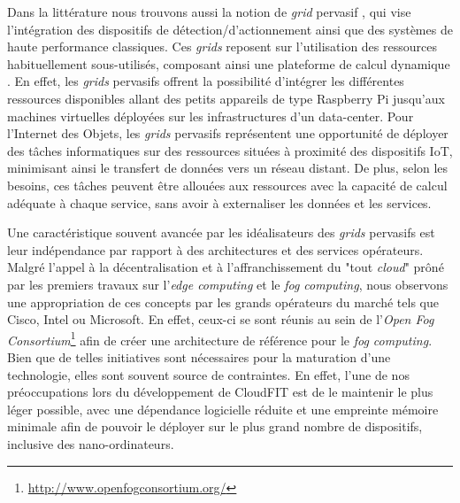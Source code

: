 Dans la littérature nous trouvons aussi la notion de \textit{grid} pervasif \cite{Parashar2010}, qui vise l'intégration des dispositifs de détection/d'actionnement ainsi que des systèmes de haute performance classiques. Ces \textit{grids} reposent sur l'utilisation des ressources habituellement sous-utilisés, composant ainsi une plateforme de calcul dynamique \cite{Steffenel2015Roma}. En effet, les \textit{grids} pervasifs offrent la possibilité d'intégrer les différentes ressources disponibles allant des petits appareils de type Raspberry Pi jusqu'aux machines virtuelles déployées sur les infrastructures d'un data-center. Pour l'Internet des Objets, les \textit{grids} pervasifs représentent une opportunité de déployer des tâches informatiques sur des ressources situées à proximité des dispositifs IoT, minimisant ainsi le transfert de données vers un réseau distant. De plus, selon les besoins, ces tâches peuvent être allouées aux ressources avec la capacité de calcul adéquate à chaque service, sans avoir à externaliser les données et les services.

Une caractéristique souvent avancée par les idéalisateurs des \textit{grids} pervasifs est leur indépendance par rapport à des architectures et des services opérateurs. Malgré l'appel à la décentralisation et à l'affranchissement du "tout \textit{cloud}" prôné par les premiers travaux sur l'\textit{edge computing} et le \textit{fog computing}, nous observons une appropriation de ces concepts par les grands opérateurs du marché tels que Cisco, Intel ou Microsoft. En effet, ceux-ci se sont réunis au sein de l'\textit{Open Fog Consortium}\footnote{\url{http://www.openfogconsortium.org/}} afin de créer une architecture de référence pour le \textit{fog computing}. Bien que de telles initiatives sont nécessaires pour la maturation d'une technologie, elles sont souvent source de contraintes. En effet, l'une de nos préoccupations lors du développement de CloudFIT est de le maintenir le plus léger possible, avec une dépendance logicielle réduite et une empreinte mémoire minimale afin de pouvoir le déployer sur le plus grand nombre de dispositifs, inclusive des nano-ordinateurs.

